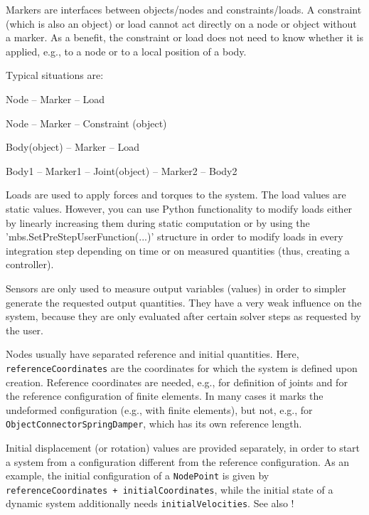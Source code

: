 Markers are interfaces between objects/nodes and constraints/loads.
A constraint (which is also an object) or load cannot act directly on a node or object without a marker.
As a benefit, the constraint or load does not need to know whether it is applied, e.g., to a node or to a local position of a body.

Typical situations are:
\bi
  \item Node -- Marker -- Load
  \item Node -- Marker -- Constraint (object)
  \item Body(object) -- Marker -- Load
  \item Body1 -- Marker1 -- Joint(object) -- Marker2 -- Body2
\ei

Loads are used to apply forces and torques to the system. The load values are static values. However, you can use Python functionality to modify loads either by linearly increasing them during static computation or by using the 'mbs.SetPreStepUserFunction(...)' structure in order to modify loads in every integration step depending on time or on measured quantities (thus, creating a controller).

Sensors are only used to measure output variables (values) in order to simpler generate the requested output quantities.
They have a very weak influence on the system, because they are only evaluated after certain solver steps as requested by the user.

Nodes usually have separated reference and initial quantities. 
Here, \texttt{referenceCoordinates} are the coordinates for which the system is defined upon creation. 
Reference coordinates are needed, e.g., for definition of joints and for the reference configuration of finite elements. In many cases it marks the undeformed configuration (e.g., with finite elements), but not, e.g., for \texttt{ObjectConnectorSpringDamper}, which has its own reference length. 

Initial displacement (or rotation) values are provided separately, in order to start a system from a configuration different from the reference configuration.
As an example, the initial configuration of a \texttt{NodePoint} is given by \texttt{referenceCoordinates + initialCoordinates}, while the initial state of a dynamic system additionally needs \texttt{initialVelocities}.
See also !

